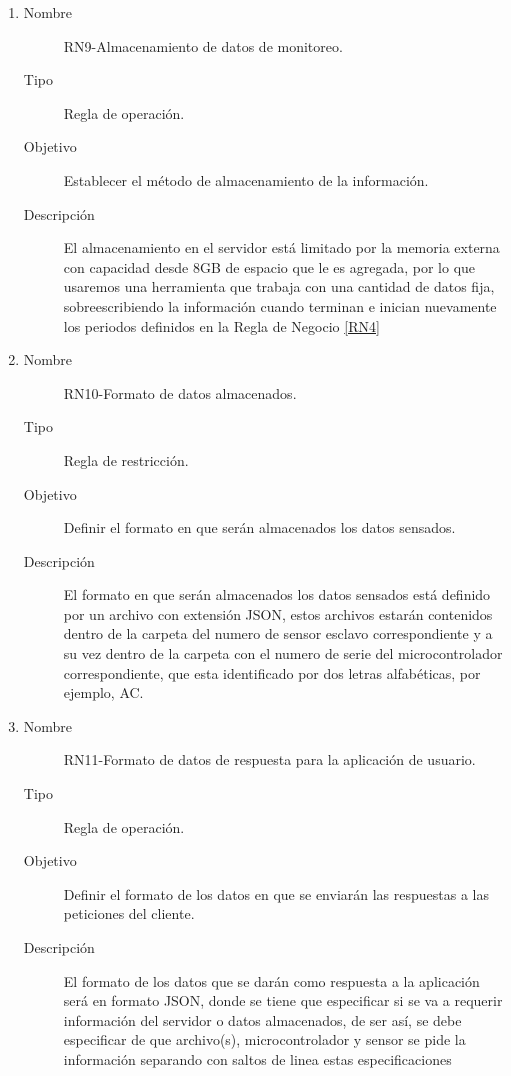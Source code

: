 \begin{enumerate}[label=RN\arabic*.]
\item \label{RN9}
		\begin{description}
			\item[Nombre] RN9-Almacenamiento de datos de monitoreo.
			\item[Tipo] Regla de operación.
			\item[Objetivo] Establecer el método de almacenamiento de la información.
			\item[Descripción] El almacenamiento en el servidor está limitado por la memoria externa con capacidad desde 8GB de espacio que le es agregada, por lo que usaremos una herramienta que trabaja con una cantidad de datos fija, sobreescribiendo la información cuando terminan e inician nuevamente los periodos definidos en la Regla de Negocio \ref{RN4}		\end{description}


\item \label{RN10}
		\begin{description}
			\item[Nombre] RN10-Formato de datos almacenados.
			\item[Tipo] Regla de restricción.
			\item[Objetivo] Definir el formato en que serán almacenados los datos sensados.
			\item[Descripción] El formato en que serán almacenados los datos sensados está definido por un archivo con extensión JSON, estos archivos estarán contenidos dentro de la carpeta del numero de sensor esclavo correspondiente y a su vez dentro de la carpeta con el numero de serie del microcontrolador correspondiente, que esta identificado por dos letras alfabéticas, por ejemplo, AC.		\end{description}
		
\item \label{RN11}
		\begin{description}
			\item[Nombre] RN11-Formato de datos de respuesta para la aplicación de usuario.
			\item[Tipo] Regla de operación.
			\item[Objetivo] Definir el formato de los datos en que se enviarán las respuestas a las peticiones del cliente.
			\item[Descripción] El formato de los datos que se darán como respuesta a la aplicación será en formato JSON, donde se tiene que especificar si se va a requerir información del servidor o datos almacenados, de ser así, se debe especificar de que archivo(s), microcontrolador y sensor se pide la información separando con saltos de linea estas especificaciones		\end{description}
		

\end{enumerate}
